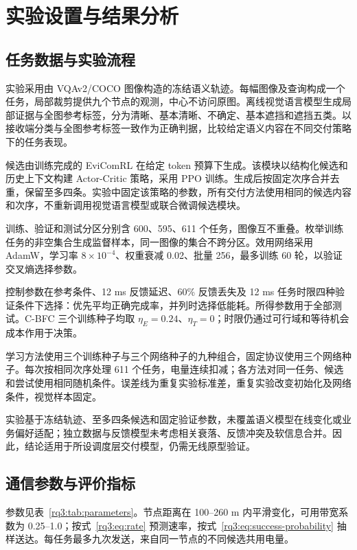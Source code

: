 \section{实验设置与结果分析}
\label{rq3:sec:experiments}

\subsection{任务数据与实验流程}
\label{rq3:subsec:experiment-data}

实验采用由 VQAv2/COCO 图像构造的冻结语义轨迹\citep{coco,vqa-v2}。每幅图像及查询构成一个任务，局部裁剪提供九个节点的观测，中心不访问原图。离线视觉语言模型生成局部证据与全图参考标签，分为清晰、基本清晰、不确定、基本遮挡和遮挡五类。以接收端分类与全图参考标签一致作为正确判据，比较给定语义内容在不同交付策略下的任务表现。

候选由训练完成的 EviComRL 在给定 token 预算下生成。该模块以结构化候选和历史上下文构建 Actor-Critic 策略，采用 PPO 训练\citep{ppo}。生成后按固定次序合并去重，保留至多四条。实验中固定该策略的参数，所有交付方法使用相同的候选内容和次序，不重新调用视觉语言模型或联合微调候选模块。

训练、验证和测试分区分别含 600、595、611 个任务，图像互不重叠。枚举训练任务的非空集合生成监督样本，同一图像的集合不跨分区。效用网络采用 AdamW，学习率 $8\times10^{-4}$、权重衰减 0.02、批量 256，最多训练 60 轮，以验证交叉熵选择参数。

控制参数在参考条件、12 ms 反馈延迟、60\% 反馈丢失及 12 ms 任务时限四种验证条件下选择：优先平均正确完成率，并列时选择低能耗。所得参数用于全部测试。C-BFC 三个训练种子均取 $\eta_E=0.24$、$\eta_T=0$；时限仍通过可行域和等待机会成本作用于决策。

学习方法使用三个训练种子与三个网络种子的九种组合，固定协议使用三个网络种子。每次按相同次序处理 611 个任务，电量连续扣减；各方法对同一任务、候选和尝试使用相同随机条件。误差线为重复实验标准差，重复实验改变初始化及网络条件，视觉样本固定。

实验基于冻结轨迹、至多四条候选和固定验证参数，未覆盖语义模型在线变化或业务偏好适配；独立数据与反馈模型未考虑相关衰落、反馈冲突及软信息合并。因此，结论适用于所设调度层交付模型，仍需无线原型验证。

\subsection{通信参数与评价指标}
\label{rq3:subsec:experiment-settings}

参数见表~\ref{rq3:tab:parameters}。节点距离在 100--260 m 内平滑变化，可用带宽系数为 0.25--1.0；按式~\eqref{rq3:eq:rate} 预测速率，按式~\eqref{rq3:eq:success-probability} 抽样送达。每任务最多九次发送，来自同一节点的不同候选共用电量。

